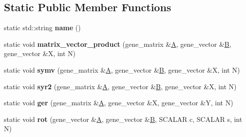 \subsection*{Static Public Member Functions}
\begin{DoxyCompactItemize}
\item 
\mbox{\label{classblas__interface_3_01_s_c_a_l_a_r_01_4_a7630e15565005b4ae7177f602019387d}} 
static std\+::string {\bfseries name} ()
\item 
\mbox{\label{classblas__interface_3_01_s_c_a_l_a_r_01_4_ac517f2bd1930982e653a4640bc386a1d}} 
static void {\bfseries matrix\+\_\+vector\+\_\+product} (gene\+\_\+matrix \&\hyperlink{group___core___module_class_eigen_1_1_matrix}{A}, gene\+\_\+vector \&\hyperlink{group___core___module_class_eigen_1_1_matrix}{B}, gene\+\_\+vector \&X, int N)
\item 
\mbox{\label{classblas__interface_3_01_s_c_a_l_a_r_01_4_a035b9344450c8fb70d82f71a3ff3d39d}} 
static void {\bfseries symv} (gene\+\_\+matrix \&\hyperlink{group___core___module_class_eigen_1_1_matrix}{A}, gene\+\_\+vector \&\hyperlink{group___core___module_class_eigen_1_1_matrix}{B}, gene\+\_\+vector \&X, int N)
\item 
\mbox{\label{classblas__interface_3_01_s_c_a_l_a_r_01_4_a24637e350843e516b274cb03488eaead}} 
static void {\bfseries syr2} (gene\+\_\+matrix \&\hyperlink{group___core___module_class_eigen_1_1_matrix}{A}, gene\+\_\+vector \&\hyperlink{group___core___module_class_eigen_1_1_matrix}{B}, gene\+\_\+vector \&X, int N)
\item 
\mbox{\label{classblas__interface_3_01_s_c_a_l_a_r_01_4_a5ff8e5f7433fc6f2cf309830e5bf4131}} 
static void {\bfseries ger} (gene\+\_\+matrix \&\hyperlink{group___core___module_class_eigen_1_1_matrix}{A}, gene\+\_\+vector \&X, gene\+\_\+vector \&Y, int N)
\item 
\mbox{\label{classblas__interface_3_01_s_c_a_l_a_r_01_4_aadc4b065c56fc4809f9383acda970595}} 
static void {\bfseries rot} (gene\+\_\+vector \&\hyperlink{group___core___module_class_eigen_1_1_matrix}{A}, gene\+\_\+vector \&\hyperlink{group___core___module_class_eigen_1_1_matrix}{B}, S\+C\+A\+L\+AR c, S\+C\+A\+L\+AR s, int N)

\end{DoxyCompactItemize}
